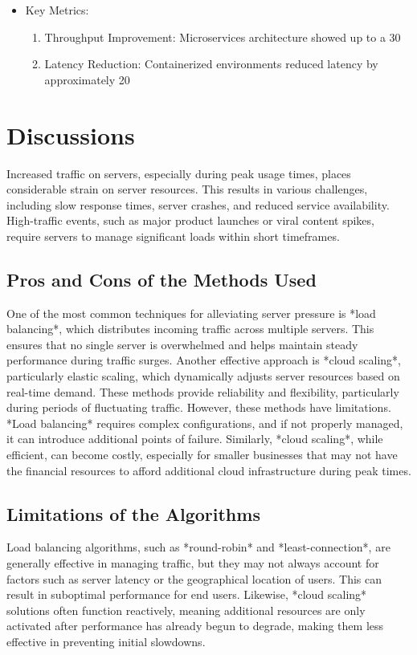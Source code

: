 \documentclass{article}
\begin{document}
\begin{itemize}
    \item Key Metrics:
    \begin{enumerate}
        \item Throughput Improvement: Microservices architecture showed up to a 30%

        \item Latency Reduction: Containerized environments reduced latency by approximately 20%
    \end{enumerate}
\end{itemize}

\section{Discussions}
Increased traffic on servers, especially during peak usage times, places considerable strain on server resources. This results in various challenges, including slow response times, server crashes, and reduced service availability. High-traffic events, such as major product launches or viral content spikes, require servers to manage significant loads within short timeframes.

\subsection{Pros and Cons of the Methods Used}
One of the most common techniques for alleviating server pressure is *load balancing*, which distributes incoming traffic across multiple servers. This ensures that no single server is overwhelmed and helps maintain steady performance during traffic surges. Another effective approach is *cloud scaling*, particularly elastic scaling, which dynamically adjusts server resources based on real-time demand. These methods provide reliability and flexibility, particularly during periods of fluctuating traffic.
However, these methods have limitations. *Load balancing* requires complex configurations, and if not properly managed, it can introduce additional points of failure. Similarly, *cloud scaling*, while efficient, can become costly, especially for smaller businesses that may not have the financial resources to afford additional cloud infrastructure during peak times.
\subsection{Limitations of the Algorithms}
Load balancing algorithms, such as *round-robin* and *least-connection*, are generally effective in managing traffic, but they may not always account for factors such as server latency or the geographical location of users. This can result in suboptimal performance for end users. Likewise, *cloud scaling* solutions often function reactively, meaning additional resources are only activated after performance has already begun to degrade, making them less effective in preventing initial slowdowns.
\end{document}
